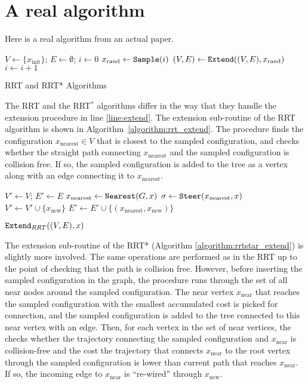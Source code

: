 \documentclass{article}
\begin{document}
\section{A real algorithm}

Here is a real algorithm from an actual paper.


\begin{algorithm}[t] \small
  $V \leftarrow \{ x_\mathrm{init}\}$; $E \leftarrow \emptyset$; $i\leftarrow 0$\; \label{line:initial}
   { \label{line:iteration_start}
    $x_\mathrm{rand} \leftarrow {\tt Sample}(i)$\;  \label{line:sample} 
    $(V, E)\leftarrow {\tt Extend}((V,E),x_\mathrm{rand})$\;  \label{line:extend}
    $i \leftarrow i + 1$\; \label{line:iteration_end}
  }
  \caption{RRT and RRT* Algorithms}
  \label{algorithm:RRT_body}
\end{algorithm}

The RRT and the RRT$^*$ algorithms differ in the way that they handle the extension procedure in line \ref{line:extend}.
%
The extension sub-routine of the RRT algorithm is shown in Algorithm~\ref{algorithm:rrt_extend}. 
%
The procedure finds the configuration $x_\mathrm{nearest} \in V$ that is closest to the sampled configuration, and checks whether the straight path connecting $x_\mathrm{nearest}$ and the sampled configuration is collision free. If so, the sampled configuration is added to the tree as a vertex along with an edge connecting it to $x_\mathrm{nearest}$.

\begin{algorithm}[t] \small
    $V' \leftarrow V$; $E' \leftarrow E$\;
    $x_\mathrm{nearest} \leftarrow {\tt Nearest} (G,x)$\; 
    $\sigma \leftarrow {\tt Steer} (x_\mathrm{nearest}, x)$\; 
    {
        $V' \leftarrow V' \cup \{x_\mathrm{new}\}$\; 
        $E' \leftarrow E' \cup \{ (x_\mathrm{nearest}, x_\mathrm{new})\}$\; 
    }
    \caption{ ${\tt Extend}_{RRT} ((V,E), x)$ }
    \label{algorithm:rrt_extend}
\end{algorithm}

The extension sub-routine of the RRT* (Algorithm \ref{algorithm:rrtstar_extend}) is slightly more involved. 
%
The same operations are performed as in the RRT up to the point of checking that the path is collision free. 
%
However, before inserting the sampled configuration in the graph, the procedure runs through the set of all near nodes around the sampled configuration. The near vertex $x_\mathrm{near}$ that reaches the sampled configuration with the smallest accumulated cost is picked for connection, and the sampled configuration is added to the tree connected to this near vertex with an edge. 
%
Then, for each vertex in the set of near vertices, the checks whether the trajectory connecting the sampled configuration and $x_\mathrm{near}$ is collision-free and the cost the trajectory that connects $x_\mathrm{near}$ to the root vertex through the sampled configuration is lower than current path that reaches $x_\mathrm{near}$.
%
If so, the incoming edge to $x_\mathrm{near}$ is ``re-wired'' through $x_\mathrm{new}$.
\end{document}
